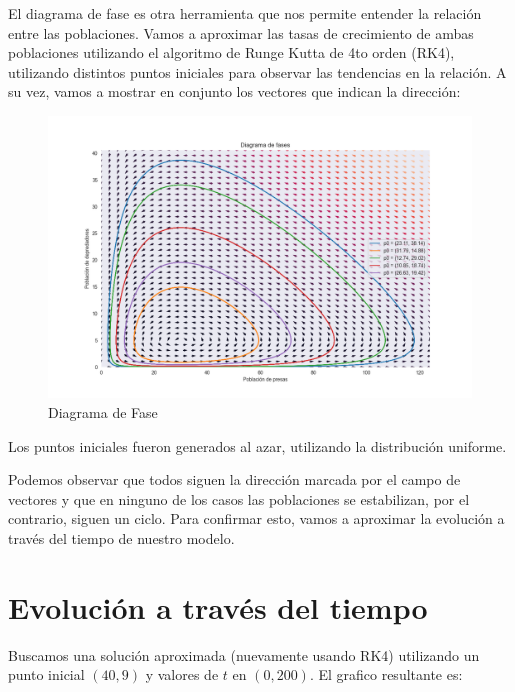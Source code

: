 \documentclass{article}
\begin{document}
El diagrama de fase es otra herramienta que nos permite entender la relación entre las poblaciones. Vamos a aproximar las tasas de crecimiento de ambas poblaciones utilizando el algoritmo de Runge Kutta de 4to orden (RK4), utilizando distintos puntos iniciales para observar las tendencias en la relación. A su vez, vamos a mostrar en conjunto los vectores que indican la dirección:

\begin{figure}[H]
  \includegraphics[width=\linewidth]{./diagramas/fases.png}
  \caption{Diagrama de Fase}
\end{figure}

Los puntos iniciales fueron generados al azar, utilizando la distribución uniforme.

Podemos observar que todos siguen la dirección marcada por el campo de vectores y que en ninguno de los casos las poblaciones se estabilizan, por el contrario, siguen un ciclo. Para confirmar esto, vamos a aproximar la evolución a través del tiempo de nuestro modelo.


\pagebreak
\section{Evolución a través del tiempo}

Buscamos una solución aproximada (nuevamente usando RK4) utilizando un punto inicial $(40, 9)$ y valores de $t$ en $(0, 200)$. El grafico resultante es:
\end{document}
